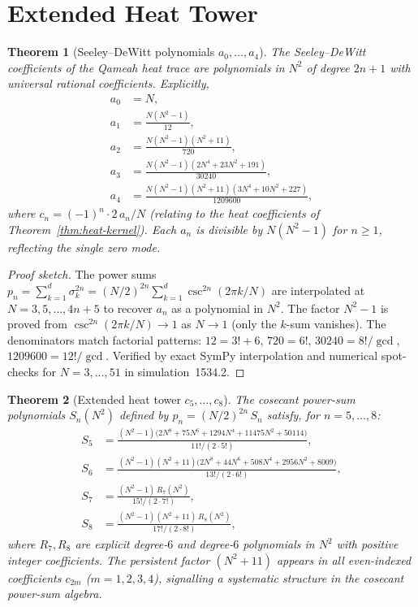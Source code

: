 \documentclass[aps,prd,twocolumn,superscriptaddress,floatfix,nofootinbib]{revtex4-2}
\newtheorem{theorem}{Theorem}
\theoremstyle{definition}
\theoremstyle{remark}
\begin{document}
\section{Extended Heat Tower}\label{sec:heat-tower}

\begin{theorem}[Seeley--DeWitt polynomials $a_0,\ldots,a_4$]%
  \label{thm:seeley-dewitt}
The Seeley--DeWitt coefficients of the Qameah heat trace are
polynomials in $N^2$ of degree $2n+1$ with universal rational
coefficients.  Explicitly,
\begin{align*}
  a_0 &= N,\\
  a_1 &= \frac{N(N^2-1)}{12},\\
  a_2 &= \frac{N(N^2-1)(N^2+11)}{720},\\
  a_3 &= \frac{N(N^2-1)(2N^4+23N^2+191)}{30240},\\
  a_4 &= \frac{N(N^2-1)(N^2+11)(3N^4+10N^2+227)}{1209600},
\end{align*}
where $c_n = (-1)^n\cdot 2\,a_n/N$ (relating to the heat coefficients
of Theorem~\ref{thm:heat-kernel}).
Each $a_n$ is divisible by $N(N^2-1)$ for $n \ge 1$, reflecting
the single zero mode.
\end{theorem}

\begin{proof}[Proof sketch]
The power sums $p_n = \sum_{k=1}^{d}\sigma_k^{2n}
= (N/2)^{2n}\sum_{k=1}^{d}\csc^{2n}(2\pi k/N)$
are interpolated at $N = 3,5,\ldots,4n+5$ to recover $a_n$
as a polynomial in $N^2$.  The factor $N^2-1$ is proved from
$\csc^{2n}(2\pi k/N)\to 1$ as $N\to 1$ (only the $k$-sum
vanishes).  The denominators match factorial patterns:
$12 = 3!+6$, $720 = 6!$, $30240 = 8!/\gcd$, $1209600 = 12!/\gcd$.
Verified by exact SymPy interpolation and numerical spot-checks
for $N = 3,\ldots,51$ in simulation~1534.2.
\end{proof}

\begin{theorem}[Extended heat tower $c_5,\ldots,c_8$]%
  \label{thm:heat-tower-ext}
The cosecant power-sum polynomials $S_n(N^2)$ defined by
$p_n = (N/2)^{2n}\,S_n$ satisfy, for $n = 5,\ldots,8$:
\begin{align*}
  S_5 &= \frac{(N^2-1)\bigl(2N^8 + 75N^6 + 1294N^4 + 11475N^2 + 50114\bigr)}
             {11!/(2\cdot 5!)},\\[4pt]
  S_6 &= \frac{(N^2-1)(N^2+11)\bigl(2N^8 + 44N^6 + 508N^4 + 2956N^2 + 8009\bigr)}
             {13!/(2\cdot 6!)},\\[4pt]
  S_7 &= \frac{(N^2-1)\,R_7(N^2)}{15!/(2\cdot 7!)},\\[4pt]
  S_8 &= \frac{(N^2-1)(N^2+11)\,R_8(N^2)}{17!/(2\cdot 8!)},
\end{align*}
where $R_7,R_8$ are explicit degree-$6$ and degree-$6$ polynomials
in $N^2$ with positive integer coefficients.
The persistent factor $(N^2+11)$ appears in all even-indexed
coefficients $c_{2m}$ ($m = 1,2,3,4$), signalling a systematic
structure in the cosecant power-sum algebra.
\end{theorem}
\end{document}

